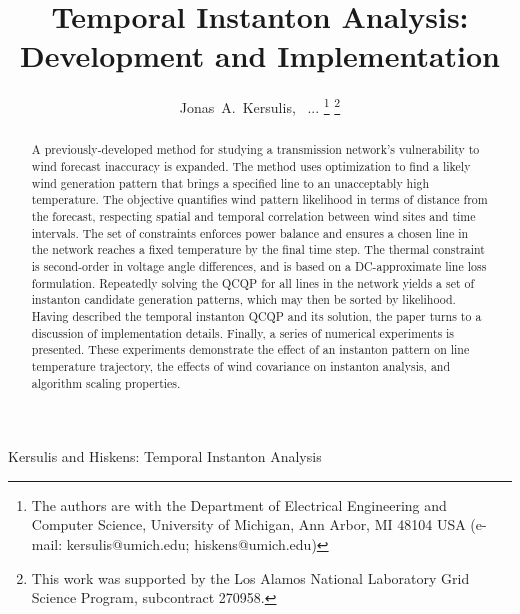 \documentclass[journal,twoside]{IEEEtran}
\begin{document}
\title{Temporal Instanton Analysis:\\
Development and Implementation}

\author{Jonas~A.~Kersulis,~
        ... %
\thanks{The authors are with the Department of Electrical Engineering and Computer Science, University of Michigan, Ann Arbor, MI 48104 USA (e-mail: 
kersulis@umich.edu; hiskens@umich.edu)}%
\thanks{This work was supported by the Los Alamos National Laboratory Grid Science Program, subcontract 270958.}}%

%
{Kersulis and Hiskens: Temporal Instanton Analysis}
% 

\maketitle

\begin{abstract}
A previously-developed method for studying a transmission network's vulnerability to wind forecast inaccuracy is expanded. The method uses optimization to find a likely wind generation pattern that brings a specified line to an unacceptably high temperature. The objective quantifies wind pattern likelihood in terms of distance from the forecast, respecting spatial and temporal correlation between wind sites and time intervals. The set of constraints enforces power balance and ensures a chosen line in the network reaches a fixed temperature by the final time step. The thermal constraint is second-order in voltage angle differences, and is based on a DC-approximate line loss formulation. Repeatedly solving the QCQP for all lines in the network yields a set of instanton candidate generation patterns, which may then be sorted by likelihood. Having described the temporal instanton QCQP and its solution, the paper turns to a discussion of implementation details. Finally, a series of numerical experiments is presented. These experiments demonstrate the effect of an instanton pattern on line temperature trajectory, the effects of wind covariance on instanton analysis, and algorithm scaling properties.
\end{abstract}
\end{document}

